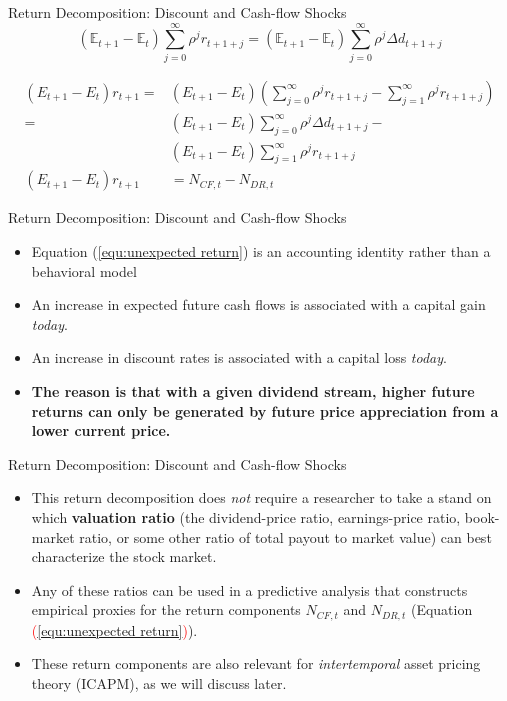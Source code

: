 \documentclass{beamer}
\begin{document}
\begin{frame}{Return Decomposition: Discount and Cash-flow Shocks}
    \begin{equation}
        \left(\mathbb{E}_{t+1}-\mathbb{E}_t\right) \sum_{j=0}^{\infty} \rho^j r_{t+1+j}=\left(\mathbb{E}_{t+1}-\mathbb{E}_t\right) \sum_{j=0}^{\infty} \rho^j \Delta d_{t+1+j} 
    \end{equation}

    \begin{equation}\label{equ:unexpected return}
    \begin{aligned}
    \left(E_{t+1}-E_t\right) r_{t+1} = & \left(E_{t+1}-E_t\right) (\sum_{j=0}^{\infty} \rho^j r_{t+1+j} - \sum_{j=1}^{\infty} \rho^j r_{t+1+j}) \\
    = &\left(E_{t+1}-E_t\right) \sum_{j=0}^{\infty} \rho^j \Delta d_{t+1+j}- \\
 & \left(E_{t+1}-E_t\right) \sum_{j=1}^{\infty} \rho^j r_{t+1+j} \\
    \left(E_{t+1}-E_t\right) r_{t+1} & =N_{C F, t}-N_{D R, t}
    \end{aligned}
    \end{equation}
\end{frame}


\begin{frame}{Return Decomposition: Discount and Cash-flow Shocks}
	\begin{itemize}
		\item Equation (\alert{\ref{equ:unexpected return}}) is an accounting identity rather than a behavioral model
		\item An increase in expected future cash flows is associated with a capital gain \textit{today}.
		\item An increase in discount rates is associated with a capital loss \textit{today}.
		\item \textbf{The reason is that with a given dividend stream, higher future returns can only be generated by future price appreciation from a lower current price.}
	\end{itemize}
\end{frame}


\begin{frame}{Return Decomposition: Discount and Cash-flow Shocks}
	\begin{itemize}
		\item This return decomposition does \textit{not} require a researcher to take a stand on which \textbf{valuation ratio} (the dividend-price ratio, earnings-price ratio, book-market ratio, or some other ratio of total payout to market value) can best characterize the stock market.
		\item Any of these ratios can be used in a predictive analysis that constructs empirical proxies for the return components $ N_{CF,t} $ and $ N_{DR,t} $ (Equation \textcolor{red}{(\ref{equ:unexpected return})}).
		\item These return components are also relevant for \textit{intertemporal} asset pricing theory (ICAPM), as we will discuss later.
	\end{itemize}  
\end{frame}
\end{document}
